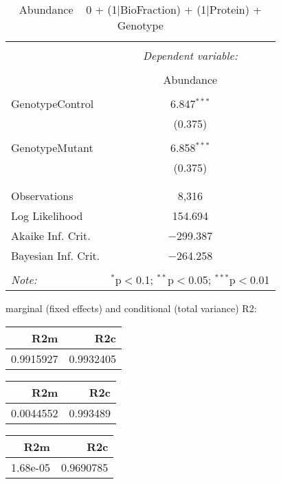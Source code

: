 \documentclass[11pt]{report}
\begin{document}
\begin{table}[!htbp] \centering 
  \caption{Abundance ~ 0 + (1|BioFraction) + (1|Protein) + Genotype} 
  \label{} 
\begin{tabular}{@{\extracolsep{5pt}}lc} 
\\[-1.8ex]\hline 
\hline \\[-1.8ex] 
 & \multicolumn{1}{c}{\textit{Dependent variable:}} \\ 
\cline{2-2} 
\\[-1.8ex] & Abundance \\ 
\hline \\[-1.8ex] 
 GenotypeControl & 6.847$^{***}$ \\ 
  & (0.375) \\ 
  & \\ 
 GenotypeMutant & 6.858$^{***}$ \\ 
  & (0.375) \\ 
  & \\ 
\hline \\[-1.8ex] 
Observations & 8,316 \\ 
Log Likelihood & 154.694 \\ 
Akaike Inf. Crit. & $-$299.387 \\ 
Bayesian Inf. Crit. & $-$264.258 \\ 
\hline 
\hline \\[-1.8ex] 
\textit{Note:}  & \multicolumn{1}{r}{$^{*}$p$<$0.1; $^{**}$p$<$0.05; $^{***}$p$<$0.01} \\ 
\end{tabular} 
\end{table} 
marginal (fixed effects) and conditional (total variance) R2:

\begin{tabular}{r|r}
\hline
R2m & R2c\\
\hline
0.9915927 & 0.9932405\\
\hline
\end{tabular}

\begin{tabular}{r|r}
\hline
R2m & R2c\\
\hline
0.0044552 & 0.993489\\
\hline
\end{tabular}

\begin{tabular}{r|r}
\hline
R2m & R2c\\
\hline
1.68e-05 & 0.9690785\\
\hline
\end{tabular}
\end{document}
